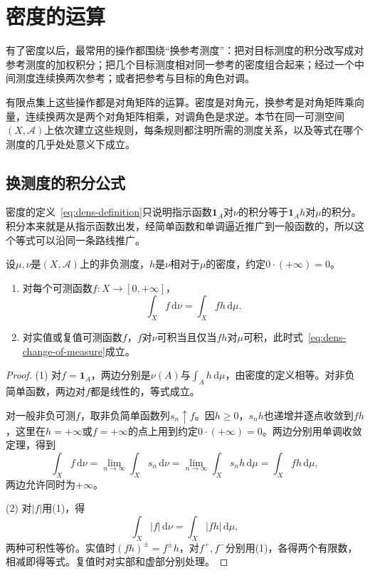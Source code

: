 \section{密度的运算}
\label{sec:dens-rules}

有了密度以后，最常用的操作都围绕“换参考测度”：把对目标测度的积分改写成对参考测度的加权积分；把几个目标测度相对同一参考的密度组合起来；经过一个中间测度连续换两次参考；或者把参考与目标的角色对调。

有限点集上这些操作都是对角矩阵的运算。密度是对角元，换参考是对角矩阵乘向量，连续换两次是两个对角矩阵相乘，对调角色是求逆。本节在同一可测空间$(X,\mathcal A)$上依次建立这些规则，每条规则都注明所需的测度关系，以及等式在哪个测度的几乎处处意义下成立。

\subsection{换测度的积分公式}
\label{sec:dens-change-of-measure}

密度的定义~\eqref{eq:dens-definition}只说明指示函数$\mathbf 1_A$对$\nu$的积分等于$\mathbf 1_Ah$对$\mu$的积分。积分本来就是从指示函数出发，经简单函数和单调逼近推广到一般函数的，所以这个等式可以沿同一条路线推广。

\begin{theorem}[换测度公式]
\label{thm:dens-change-of-measure}
设$\mu,\nu$是$(X,\mathcal A)$上的非负测度，$h$是$\nu$相对于$\mu$的密度，约定$0\cdot(+\infty)=0$。
\begin{enumerate}
\item 对每个可测函数$f:X\to[0,+\infty]$，
\begin{equation}
\int_Xf\,\mathrm d\nu=\int_Xfh\,\mathrm d\mu .
\label{eq:dens-change-of-measure}
\end{equation}
\item 对实值或复值可测函数$f$，$f$对$\nu$可积当且仅当$fh$对$\mu$可积，此时式~\eqref{eq:dens-change-of-measure}成立。
\end{enumerate}
\end{theorem}

\begin{proof}
(1) 对$f=\mathbf 1_A$，两边分别是$\nu(A)$与$\int_Ah\,\mathrm d\mu$，由密度的定义相等。对非负简单函数，两边对$f$都是线性的，等式成立。

对一般非负可测$f$，取非负简单函数列$s_n\uparrow f$。因$h\geq0$，$s_nh$也递增并逐点收敛到$fh$，这里在$h=+\infty$或$f=+\infty$的点上用到约定$0\cdot(+\infty)=0$。两边分别用单调收敛定理，得到
\[
\int_Xf\,\mathrm d\nu=\lim_{n\to\infty}\int_Xs_n\,\mathrm d\nu=\lim_{n\to\infty}\int_Xs_nh\,\mathrm d\mu=\int_Xfh\,\mathrm d\mu ,
\]
两边允许同时为$+\infty$。

(2) 对$\lvert f\rvert$用(1)，得
\[
\int_X\lvert f\rvert\,\mathrm d\nu=\int_X\lvert fh\rvert\,\mathrm d\mu ,
\]
两种可积性等价。实值时$(fh)^\pm=f^\pm h$，对$f^+,f^-$分别用(1)，各得两个有限数，相减即得等式。复值时对实部和虚部分别处理。
\end{proof}

